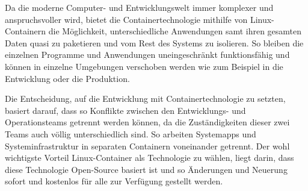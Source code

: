 
Da die moderne Computer- und Entwicklungswelt immer komplexer und anspruchsvoller wird, bietet die Containertechnologie mithilfe von Linux-Containern die Möglichkeit, unterschiedliche Anwendungen samt ihren gesamten Daten quasi zu paketieren und vom Rest des Systems zu isolieren. So bleiben die einzelnen Programme und Anwendungen uneingeschränkt funktionsfähig und können in einzelne Umgebungen verschoben werden wie zum Beispiel in die Entwicklung oder die Produktion. \cite{Container}

Die Entscheidung, auf die Entwicklung mit Containertechnologie zu setzten, basiert darauf, dass so Konflikte zwischen den Entwicklungs- und Operationsteams getrennt werden können, da die Zuständigkeiten dieser zwei Teams auch völlig unterschiedlich sind. So arbeiten Systemapps und Systeminfrastruktur in separaten Containern voneinander getrennt. Der wohl wichtigste Vorteil Linux-Container als Technologie zu wählen, liegt darin, dass diese Technologie Open-Source basiert ist und so Änderungen und Neuerung sofort und kostenlos für alle zur Verfügung gestellt werden. \cite{Container}
